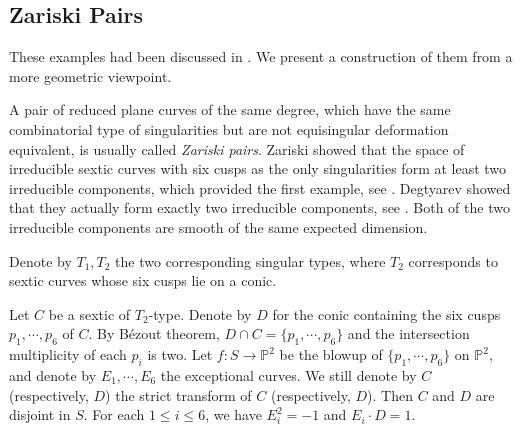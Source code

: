 \documentclass[12pt,reqno,a4paper]{amsart}
\theoremstyle{remark}
\theoremstyle{definition}
\newcommand{\PP}{\mathbb{P}}
\newcommand{\red}{\textcolor{red}}
\begin{document}
\subsection{Zariski Pairs}
\label{subsec: Zariski pair}
These examples had been discussed in \cite[\S 3]{yang2012discriminantal}.
We present a construction of them from a more geometric viewpoint.



A pair of reduced plane curves of the same degree, which have the same combinatorial type of singularities but are not equisingular deformation equivalent, is usually called \emph{Zariski pairs}.
Zariski showed that the space of irreducible sextic curves with six cusps as the only singularities form at least two irreducible components, which provided the first example, see \cite{zariski1931irregularity}. 
Degtyarev showed that they actually form exactly two irreducible components, see \cite[Theorem 5.3.2]{degtyarev2008deformations}.
Both of the two irreducible components are smooth of the same expected dimension. 

Denote by $T_1,T_2$ the two corresponding singular types, where $T_2$ corresponds to sextic curves whose six cusps lie on a conic.

Let $C$ be a sextic of $T_2$-type.
Denote by $D$ for the conic containing the six cusps $p_1,\cdots,p_6$ of $C$.
By B\'ezout theorem, $D\cap C = \{ p_1,\cdots,p_6 \}$ and the intersection multiplicity of each $p_i$ is two.
Let $f\colon S\to \PP^2$ be the blowup of $\{ p_1,\cdots,p_6 \}$ on $\PP^2$, and denote by $E_1,\cdots,E_6$ the exceptional curves.
We still denote by $C$ (respectively, $D$) the strict transform of $C$ (respectively, $D$).
Then $C$ and $D$ are disjoint in $S$.
For each $1\le i\le 6$, we have $E_i^2=-1$ and $E_i\cdot D=1$.
\end{document}
